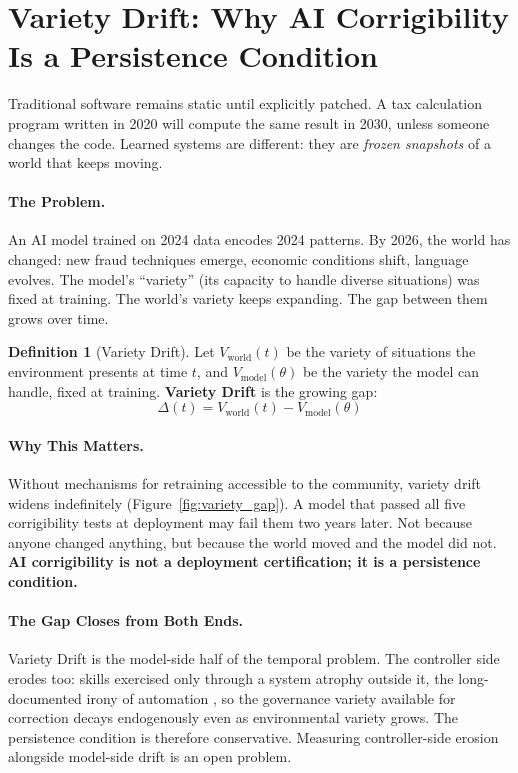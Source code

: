 \documentclass{article}
\theoremstyle{definition}
\newtheorem{definition}{Definition}[section]
\begin{document}
\section{Variety Drift: Why AI Corrigibility Is a Persistence Condition}
\label{sec:temporal}

Traditional software remains static until explicitly patched. A tax calculation program written in 2020 will compute the same result in 2030, unless someone changes the code. Learned systems are different: they are \textit{frozen snapshots} of a world that keeps moving.

\paragraph{The Problem.} An AI model trained on 2024 data encodes 2024 patterns. By 2026, the world has changed: new fraud techniques emerge, economic conditions shift, language evolves. The model's ``variety'' (its capacity to handle diverse situations) was fixed at training. The world's variety keeps expanding. The gap between them grows over time.

\begin{definition}[Variety Drift]
\label{def:variety-drift}
Let $V_{\text{world}}(t)$ be the variety of situations the environment presents at time $t$, and $V_{\text{model}}(\theta)$ be the variety the model can handle, fixed at training. \textbf{Variety Drift} is the growing gap:
\begin{equation}
\Delta(t) = V_{\text{world}}(t) - V_{\text{model}}(\theta)
\end{equation}
\end{definition}

\paragraph{Why This Matters.} Without mechanisms for retraining accessible to the community, variety drift widens indefinitely (Figure~\ref{fig:variety_gap}). A model that passed all five corrigibility tests at deployment may fail them two years later. Not because anyone changed anything, but because the world moved and the model did not. \textbf{AI corrigibility is not a deployment certification; it is a persistence condition.}

\paragraph{The Gap Closes from Both Ends.} Variety Drift is the model-side half of the temporal problem. The controller side erodes too: skills exercised only through a system atrophy outside it, the long-documented irony of automation \citep{bainbridge1983}, so the governance variety available for correction decays endogenously even as environmental variety grows. The persistence condition is therefore conservative. Measuring controller-side erosion alongside model-side drift is an open problem.
\end{document}
